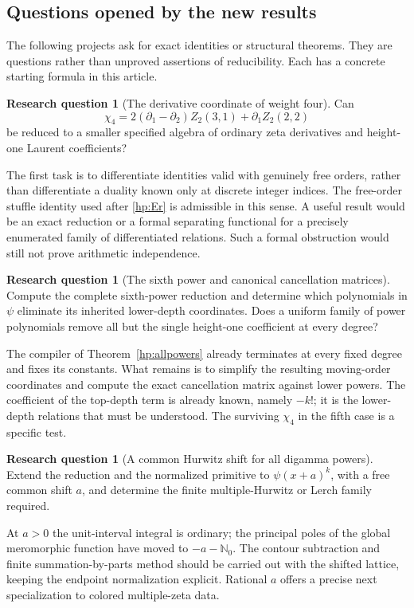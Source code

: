 \documentclass[11pt]{article}
\numberwithin{equation}{section}
\theoremstyle{plain}
\theoremstyle{definition}
\newtheorem{question}[theorem]{Research question}
\theoremstyle{remark}
\newcommand{\N}{\mathbb N}
\begin{document}
\subsection{Questions opened by the new results}

The following projects ask for exact identities or structural theorems.
They are questions rather than unproved assertions of reducibility.
Each has a concrete starting formula in this article.

\begin{question}[The derivative coordinate of weight four]
Can
\[
 \chi_4=2(\partial_1-\partial_2)Z_2(3,1)+\partial_1Z_2(2,2)
\]
be reduced to a smaller specified algebra of ordinary zeta derivatives
and height-one Laurent coefficients?
\end{question}
The first task is to differentiate identities valid with genuinely free
orders, rather than differentiate a duality known only at discrete
integer indices. The free-order stuffle identity used after
\eqref{hp:Er} is admissible in this sense. A useful result would be an
exact reduction or a formal separating functional for a precisely
enumerated family of differentiated relations. Such a formal obstruction
would still not prove arithmetic independence.

\begin{question}[The sixth power and canonical cancellation matrices]
Compute the complete sixth-power reduction and determine which
polynomials in $\psi$ eliminate its inherited lower-depth coordinates.
Does a uniform family of power polynomials remove all but the single
height-one coefficient at every degree?
\end{question}
The compiler of Theorem~\ref{hp:allpowers} already terminates at every
fixed degree and fixes its constants. What remains is to simplify the
resulting moving-order coordinates and compute the exact cancellation
matrix against lower powers. The coefficient of the top-depth term is
already known, namely $-k!$; it is the lower-depth relations that must be
understood. The surviving $\chi_4$ in the fifth case is a specific test.

\begin{question}[A common Hurwitz shift for all digamma powers]
Extend the reduction and the normalized primitive to
$\psi(x+a)^k$, with a free common shift $a$, and determine the finite
multiple-Hurwitz or Lerch family required.
\end{question}
At $a>0$ the unit-interval integral is ordinary; the principal poles of
the global meromorphic function have moved to $-a-\N_0$.
The contour subtraction and finite summation-by-parts method should be
carried out with the shifted lattice, keeping the endpoint normalization
explicit. Rational $a$ offers a precise next specialization to colored
multiple-zeta data.
\end{document}
